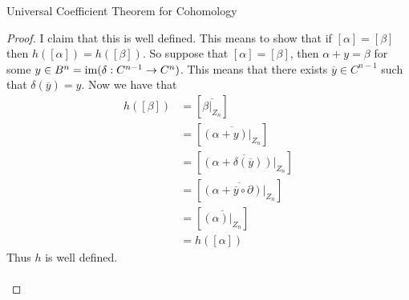 \documentclass[a4paper]{article}
\begin{document}
\begin{thm}{Universal Coefficient Theorem for Cohomology}{}
\begin{proof}
I claim that this is well defined. This means to show that if $[\alpha]=[\beta]$ then $h([\alpha])=h([\beta])$. So suppose that $[\alpha]=[\beta]$, then $\alpha+y=\beta$ for some $y\in B^n=\operatorname{im}(\delta:C^{n-1}\to C^n)$. This means that there exists $\overline{y}\in C^{n-1}$ such that $\delta(\overline{y})=y$. Now we have that 
\begin{align*}
h([\beta])&=\left[\overline{\beta|_{Z_n}}\right]\\
&=\left[\overline{(\alpha+y)|_{Z_n}}\right]\\
&=\left[\overline{(\alpha+\delta(\overline{y}))|_{Z_n}}\right]\\
&=\left[\overline{(\alpha+\overline{y}\circ\partial)|_{Z_n}}\right]\\
&=\left[\overline{(\alpha)|_{Z_n}}\right]\tag{$\partial$ restricted to $Z_n$ is just $0$}\\
&=h([\alpha])
\end{align*}
Thus $h$ is well defined. \\~\\


\end{proof}
\end{thm}
\end{document}
